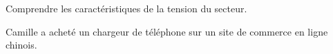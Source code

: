\tetePremStssElec

\vspace*{-36pt}

\begin{objectifs}
  \item Comprendre les caractéristiques de la tension du secteur.
\end{objectifs}

\begin{contexte}
  Camille a acheté un chargeur de téléphone sur un site de commerce en ligne chinois.

\end{contexte}


